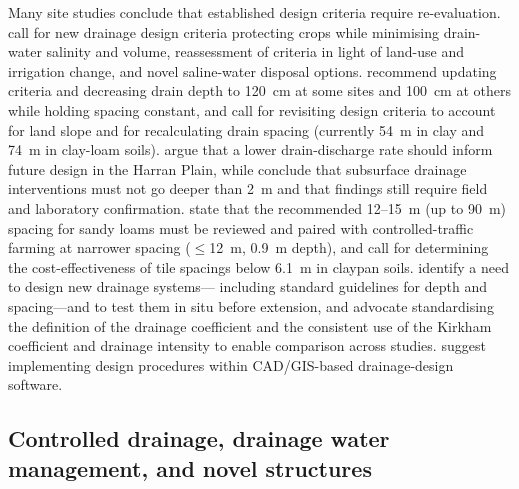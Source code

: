 \documentclass[11pt]{article}
\begin{document}
Many site studies conclude that established design criteria require
re-evaluation. \textcite{Christen2001} call for new drainage design criteria
protecting crops while minimising drain-water salinity and volume,
reassessment of criteria in light of land-use and irrigation change, and novel
saline-water disposal options. \textcite{Muhammad2021} recommend updating
criteria and decreasing drain depth to 120~cm at some sites and 100~cm at
others while holding spacing constant, and \textcite{Malota2016} call for
revisiting design criteria to account for land slope and for recalculating
drain spacing (currently 54~m in clay and 74~m in clay-loam soils).
\textcite{Bahçeci2009} argue that a lower drain-discharge rate should inform
future design in the Harran Plain, while \textcite{Kahlown2002} conclude that
subsurface drainage interventions must not go deeper than 2~m and that findings
still require field and laboratory confirmation. \textcite{Mante2022} state
that the recommended 12--15~m (up to 90~m) spacing for sandy loams must be
reviewed and paired with controlled-traffic farming at narrower spacing
($\le$12~m, 0.9~m depth), and \textcite{Nelson2017} call for determining the
cost-effectiveness of tile spacings below 6.1~m in claypan soils.
\textcite{HajAmor2019} identify a need to design new drainage systems---
including standard guidelines for depth and spacing---and to test them in situ
before extension, and \textcite{Skaggs2017} advocate standardising the
definition of the drainage coefficient and the consistent use of the Kirkham
coefficient and drainage intensity to enable comparison across studies.
\textcite{GALLICHAND1992b} suggest implementing design procedures within
CAD/GIS-based drainage-design software.

\subsection{Controlled drainage, drainage water management, and novel structures}
\end{document}
